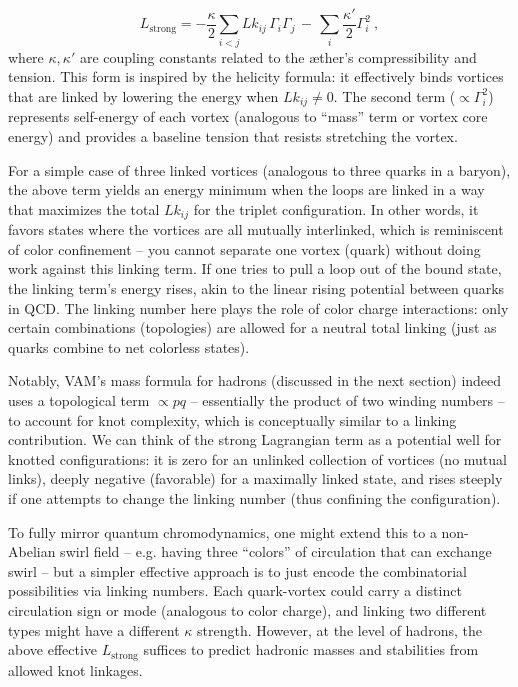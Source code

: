 \documentclass[a4paper,12pt]{article}
\begin{document}
        \[
        L_{\text{strong}} = -\frac{\kappa}{2}\sum_{i<j} Lk_{ij}\,\Gamma_i \Gamma_j \,-\, \sum_i \frac{\kappa'}{2} \Gamma_i^2~,
        \]
        where $\kappa, \kappa'$ are coupling constants related to the æther’s compressibility and tension. This form is inspired by the helicity formula: it effectively binds vortices that are linked by lowering the energy when $Lk_{ij} \neq 0$. The second term ($\propto \Gamma_i^2$) represents self-energy of each vortex (analogous to “mass” term or vortex core energy) and provides a baseline tension that resists stretching the vortex.
        
        
        For a simple case of three linked vortices (analogous to three quarks in a baryon), the above term yields an energy minimum when the loops are linked in a way that maximizes the total $Lk_{ij}$ for the triplet configuration. In other words, it favors states where the vortices are all mutually interlinked, which is reminiscent of color confinement – you cannot separate one vortex (quark) without doing work against this linking term. If one tries to pull a loop out of the bound state, the linking term’s energy rises, akin to the linear rising potential between quarks in QCD. The linking number here plays the role of color charge interactions: only certain combinations (topologies) are allowed for a neutral total linking (just as quarks combine to net colorless states).
        
        
        Notably, VAM’s mass formula for hadrons (discussed in the next section) indeed uses a topological term $\propto p q$ – essentially the product of two winding numbers – to account for knot complexity, which is conceptually similar to a linking contribution. We can think of the strong Lagrangian term as a potential well for knotted configurations: it is zero for an unlinked collection of vortices (no mutual links), deeply negative (favorable) for a maximally linked state, and rises steeply if one attempts to change the linking number (thus confining the configuration).
        
        
        To fully mirror quantum chromodynamics, one might extend this to a non-Abelian swirl field – e.g. having three “colors” of circulation that can exchange swirl – but a simpler effective approach is to just encode the combinatorial possibilities via linking numbers. Each quark-vortex could carry a distinct circulation sign or mode (analogous to color charge), and linking two different types might have a different $\kappa$ strength. However, at the level of hadrons, the above effective $L_{\text{strong}}$ suffices to predict hadronic masses and stabilities from allowed knot linkages.
        
\end{document}
